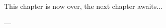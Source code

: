 \bigskip
\noindent
This chapter is now over, the next chapter awaits...

\bigskip
\noindent
\hspace{\fill}
\parbox[b]{0.4\linewidth}{
\raggedleft
\small
--- \theauthor{}\\
\thedate{}
}
%
%
%
%
%
%
%
